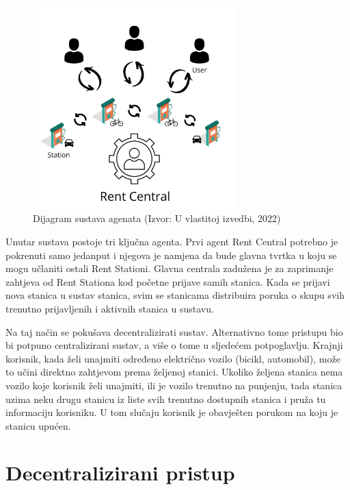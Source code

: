\documentclass{foi}
\begin{document}
\begin{figure}[h!]
	\centering
	\includegraphics[width=0.7\textwidth]{slike/rentCentral.png}
	\caption{Dijagram sustava agenata (Izvor: U vlastitoj izvedbi, 2022)}
	\label{fig:dijagramAgenti}
\end{figure}

Unutar sustava postoje tri ključna agenta. Prvi agent Rent Central potrebno je pokrenuti samo jedanput i njegova je namjena da bude glavna tvrtka u koju se mogu učlaniti ostali Rent Stationi. Glavna centrala zadužena je za zaprimanje zahtjeva od Rent Stationa kod početne prijave samih stanica. Kada se prijavi nova stanica u sustav stanica, svim se stanicama distribuira poruka o skupu svih trenutno prijavljenih i aktivnih stanica u sustavu. 

Na taj način se pokušava decentralizirati sustav. Alternativno tome pristupu bio bi potpuno centralizirani sustav, a više o tome u sljedećem potpoglavlju. Krajnji korisnik, kada želi unajmiti određeno električno vozilo (bicikl, automobil), može to učini direktno zahtjevom prema željenoj stanici. Ukoliko željena stanica nema vozilo koje korisnik želi unajmiti, ili je vozilo trenutno na punjenju, tada stanica uzima neku drugu stanicu iz liste svih trenutno dostupnih stanica i pruža tu informaciju korisniku. U tom slučaju korisnik je obavješten porukom na koju je stanicu upućen.

\section{Decentralizirani pristup}
\end{document}
